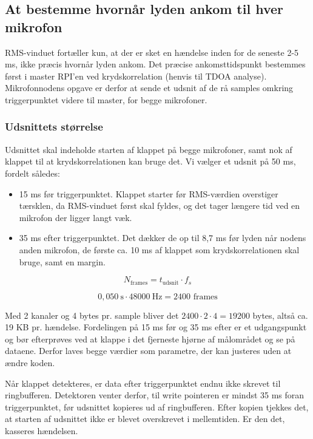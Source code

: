 \documentclass[
  danish,
]{article}
\begin{document}
\subsection{At bestemme hvornår lyden ankom til hver
mikrofon}\label{at-bestemme-hvornuxe5r-lyden-ankom-til-hver-mikrofon}

RMS-vinduet fortæller kun, at der er sket en hændelse inden for de
seneste 2-5 ms, ikke præcis hvornår lyden ankom. Det præcise
ankomsttidspunkt bestemmes først i master RPI'en ved krydskorrelation
(henvis til TDOA analyse). Mikrofonnodens opgave er derfor at sende et
udsnit af de rå samples omkring triggerpunktet videre til master, for
begge mikrofoner.

\subsubsection{Udsnittets størrelse}\label{udsnittets-stuxf8rrelse}

Udsnittet skal indeholde starten af klappet på begge mikrofoner, samt
nok af klappet til at krydskorrelationen kan bruge det. Vi vælger et
udsnit på 50 ms, fordelt således:

\begin{itemize}
\item
  15 ms før triggerpunktet. Klappet starter før RMS-værdien overstiger
  tærsklen, da RMS-vinduet først skal fyldes, og det tager længere tid
  ved en mikrofon der ligger langt væk.
\item
  35 ms efter triggerpunktet. Det dækker de op til 8,7 ms før lyden når
  nodens anden mikrofon, de første ca. 10 ms af klappet som
  krydskorrelationen skal bruge, samt en margin.
\end{itemize}

\[N_{\mathrm{frames}} = t_{\mathrm{udsnit}} \cdot f_{s}\]

\[0{,}050\ \mathrm{s} \cdot 48000\ \mathrm{Hz} = 2400 \text{ frames}\]

Med 2 kanaler og 4 bytes pr. sample bliver det \(2400 \cdot 2 \cdot 4 = 19200\) bytes,
altså ca. 19 KB pr. hændelse. Fordelingen på 15 ms før og 35 ms efter er
et udgangspunkt og bør efterprøves ved at klappe i det fjerneste hjørne
af målområdet og se på dataene. Derfor laves begge værdier som
parametre, der kan justeres uden at ændre koden.

Når klappet detekteres, er data efter triggerpunktet endnu ikke skrevet
til ringbufferen. Detektoren venter derfor, til write pointeren er
mindst 35 ms foran triggerpunktet, før udsnittet kopieres ud af
ringbufferen. Efter kopien tjekkes det, at starten af udsnittet ikke er
blevet overskrevet i mellemtiden. Er den det, kasseres hændelsen.
\end{document}
